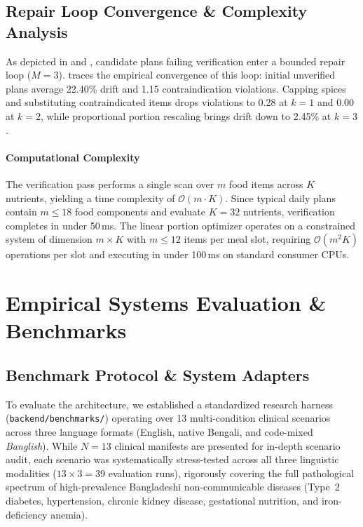 \documentclass[5p,times,twocolumn]{elsarticle}
\begin{document}
\subsection{Repair Loop Convergence \& Complexity Analysis}
As depicted in  and , candidate plans failing verification enter a bounded repair loop ($M=3$).  traces the empirical convergence of this loop: initial unverified plans average 22.40\% drift and 1.15 contraindication violations. Capping spices and substituting contraindicated items drops violations to 0.28 at $k=1$ and 0.00 at $k=2$, while proportional portion rescaling brings drift down to 2.45\% at $k=3$.

\paragraph{Computational Complexity}
The verification pass performs a single scan over $m$ food items across $K$ nutrients, yielding a time complexity of $\mathcal{O}(m \cdot K)$. Since typical daily plans contain $m \le 18$ food components and evaluate $K = 32$ nutrients, verification completes in under 50\,ms. The linear portion optimizer operates on a constrained system of dimension $m \times K$ with $m \le 12$ items per meal slot, requiring $\mathcal{O}(m^2 K)$ operations per slot and executing in under 100\,ms on standard consumer CPUs.

\section{Empirical Systems Evaluation \& Benchmarks}
\label{sec:benchmarks}

\subsection{Benchmark Protocol \& System Adapters}
To evaluate the architecture, we established a standardized research harness (\texttt{backend/benchmarks/}) operating over 13 multi-condition clinical scenarios across three language formats (English, native Bengali, and code-mixed \textit{Banglish}). While $N=13$ clinical manifests are presented for in-depth scenario audit, each scenario was systematically stress-tested across all three linguistic modalities ($13 \times 3 = 39$ evaluation runs), rigorously covering the full pathological spectrum of high-prevalence Bangladeshi non-communicable diseases (Type~2 diabetes, hypertension, chronic kidney disease, gestational nutrition, and iron-deficiency anemia).
\end{document}
